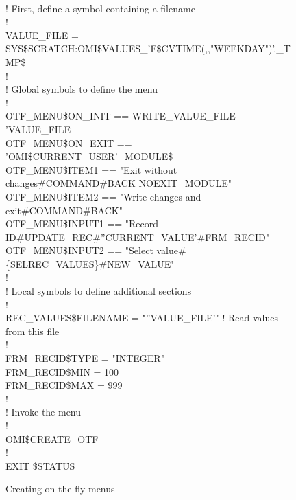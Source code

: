 \documentclass[a4paper]{book}
\renewcommand{\indent}{\hspace*{5mm}}
\begin{document}
\begin{figure}[ht]
\begin{minipage}[t]{\textwidth}
\hrulefill \\
\begin{small}
\begin{ttfamily}
\indent{\$}! First, define a symbol containing a filename \\
\indent{\$}! \\
\indent{\$} VALUE{\_}FILE = SYS{\$}SCRATCH:OMI{\$}VALUES{\_}'F{\$}CVTIME(,,"WEEKDAY")'.{\_}TMP{\$} \\
\indent{\$}! \\
\indent{\$}! Global symbols to define the menu \\
\indent{\$}! \\
\indent{\$} OTF{\_}MENU{\$}ON{\_}INIT == WRITE{\_}VALUE{\_}FILE 'VALUE{\_}FILE \\
\indent{\$} OTF{\_}MENU{\$}ON{\_}EXIT == 'OMI{\$}CURRENT{\_}USER'{\_}MODULE{\$} \\
\indent{\$} OTF{\_}MENU{\$}ITEM1 == "Exit without changes{\#}COMMAND{\#}BACK NOEXIT{\_}MODULE" \\
\indent{\$} OTF{\_}MENU{\$}ITEM2 == "Write changes and exit{\#}COMMAND{\#}BACK" \\
\indent{\$} OTF{\_}MENU{\$}INPUT1 == "Record ID{\#}UPDATE{\_}REC{\#}''CURRENT{\_}VALUE'{\#}FRM{\_}RECID"  \\
\indent{\$} OTF{\_}MENU{\$}INPUT2 == "Select value{\#}{\{}SEL\textbar REC{\_}VALUES{\}}{\#}NEW{\_}VALUE" \\
\indent{\$}! \\
\indent{\$}! Local symbols to define additional sections \\
\indent{\$}! \\
\indent{\$} REC{\_}VALUES{\$}FILENAME = "''VALUE{\_}FILE'" ! Read values from this file \\
\indent{\$}! \\
\indent{\$} FRM{\_}RECID{\$}TYPE = "INTEGER" \\
\indent{\$} FRM{\_}RECID{\$}MIN = 100 \\
\indent{\$} FRM{\_}RECID{\$}MAX = 999 \\
\indent{\$}! \\
\indent{\$}! Invoke the menu \\
\indent{\$}! \\
\indent{\$} OMI{\$}CREATE{\_}OTF \\
\indent{\$}! \\
\indent{\$} EXIT {\$}STATUS \\
\end{ttfamily}
\end{small}
\caption{Creating on-the-fly menus}\label{fig:otfcre}
\hrulefill
\end{minipage}
\end{figure}
\end{document}
